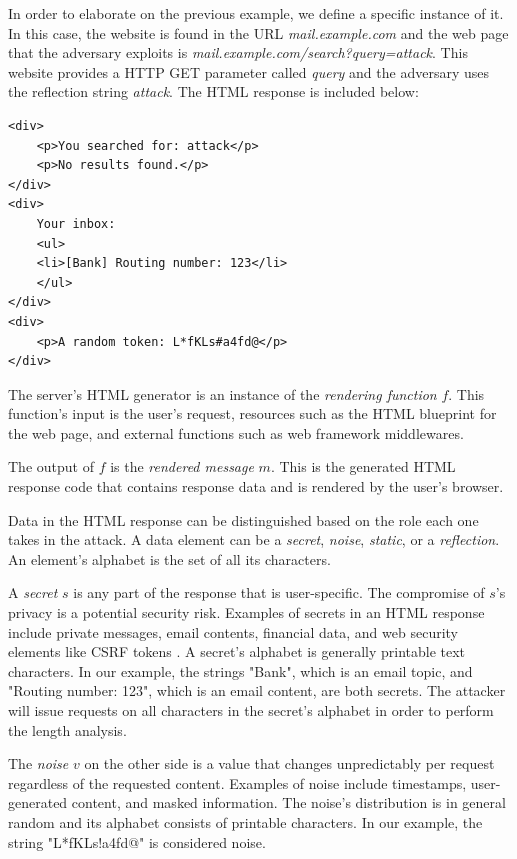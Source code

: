 \documentclass[conference, letterpaper, 10pt]{IEEEtran}
\begin{document}
In order to elaborate on the previous example, we define a specific instance of
it. In this case, the website is found in the URL \textit{mail.example.com} and
the web page that the adversary exploits is
\textit{mail.example.com/search?query=attack}. This website provides a HTTP GET
parameter called \textit{query} and the adversary uses the reflection string
\textit{attack}. The HTML response is included below:

\begin{lstlisting}[basicstyle=\small\ttfamily]
<div>
    <p>You searched for: attack</p>
    <p>No results found.</p>
</div>
<div>
    Your inbox:
    <ul>
    <li>[Bank] Routing number: 123</li>
    </ul>
</div>
<div>
    <p>A random token: L*fKLs#a4fd@</p>
</div>
\end{lstlisting}

The server's HTML generator is an instance of the \textit{rendering
function} $f$. This function's input is the user's request, resources such as the
HTML blueprint for the web page, and external functions such as web framework
middlewares.

The output of $f$ is the \textit{rendered message} $m$. This
is the generated HTML response code that contains response data and is
rendered by the user's browser.

Data in the HTML response can be distinguished based on the role each one takes
in the attack. A data element can be a \textit{secret}, \textit{noise},
\textit{static}, or a \textit{reflection}. An element's alphabet is the set of
all its characters.

A \textit{secret} $s$ is any part of the response that is user-specific. The
compromise of $s$'s privacy is a potential security risk. Examples of secrets in
an HTML response include private messages, email contents, financial data, and
web security elements like CSRF tokens \cite{c16}. A secret's alphabet is
generally printable text characters. In our example, the strings "Bank", which
is an email topic, and "Routing number: 123", which is an email content, are
both secrets. The attacker will issue requests on all characters in the secret's
alphabet in order to perform the length analysis.

The \textit{noise} $v$ on the other side is a value that changes unpredictably
per request regardless of the requested content. Examples of noise include
timestamps, user-generated content, and masked information. The noise's
distribution is in general random and its alphabet consists of printable
characters. In our example, the string "L*fKLs!a4fd@" is considered noise.
\end{document}
